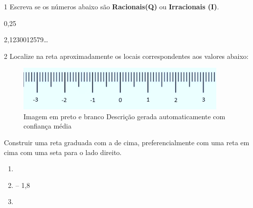 
\num{1} Escreva se os números abaixo são \textbf{Racionais(Q)} ou 
\textbf{Irracionais (I)}.

\begin{escolha}
  \item 0,25

  \item \Pi
  
  \item {}
  
  \item {}
  
  \item 2,1230012579\ldots{}
\end{escolha}


\num{2} Localize na reta aproximadamente os locais correspondentes aos
valores abaixo:

\begin{figure}
\centering
\includegraphics[width=4.10036in,height=0.88341in]{./_SAEB_9_MAT/media/image4.png}
\caption{Imagem em preto e branco Descrição gerada automaticamente com
confiança média}
\end{figure}

Construir uma reta graduada com a de cima, preferencialmente com uma
reta em cima com uma seta para o lado direito.

\begin{enumerate}
  \item {}

  \item -- 1,8
  
  \item {}
\end{enumerate}


